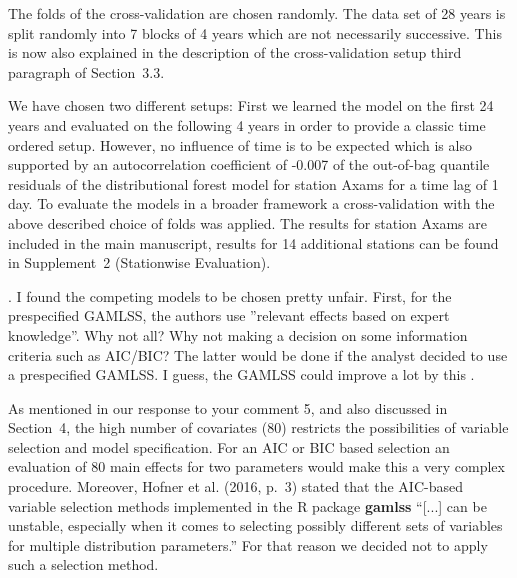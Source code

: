 \documentclass[american,foldmarks=false,noconfig]{uibklttr}
\newenvironment{review}{\fontshape{\itdefault}\fontseries{\bfdefault} \selectfont \smallskip}{\par}
\begin{document}
The folds of the cross-validation are chosen randomly. The data 
set of 28 years is split randomly into 7 blocks of 4 years which 
are not necessarily successive. This is now also explained in the 
description of the cross-validation setup third paragraph of 
Section~3.3.

We have chosen two different setups: First we learned the model
on the first 24 years and evaluated on the following 4 years
in order to provide a classic time ordered setup. 
However, no influence of time is to be expected which is also supported by 
an autocorrelation coefficient of -0.007 of the out-of-bag quantile 
residuals of the distributional forest model for station Axams for
a time lag of 1 day.
To evaluate the models in a broader framework a cross-validation 
with the above described choice of folds was applied. The results
for station Axams are included in the main manuscript, results
for 14 additional stations can be found in
Supplement~2 (Stationwise Evaluation).


\begin{review}
8. I found the competing models to be chosen pretty unfair. 
First, for the prespecified GAMLSS, the authors use 
”relevant effects based on expert knowledge”. Why not all? 
Why not making a decision on some information criteria such as AIC/BIC? 
The latter would be done if the analyst decided to use a prespecified 
GAMLSS. I guess, the GAMLSS could improve a lot by this . 
\end{review}

As mentioned in our response to your comment 5, and also discussed in Section~4, 
the high number of covariates (80) restricts the possibilities of variable 
selection and model specification. For an AIC or BIC based selection an 
evaluation of 80 main effects for two parameters would make this a very complex
procedure. Moreover, Hofner et al. (2016, p.~3) stated that the 
AIC-based variable selection methods implemented in the \textsf{R} 
package \textbf{gamlss} ``[...] can be unstable, especially when it comes 
to selecting possibly different sets of variables for 
multiple distribution parameters.'' For that reason we decided
not to apply such a selection method.
\end{document}
